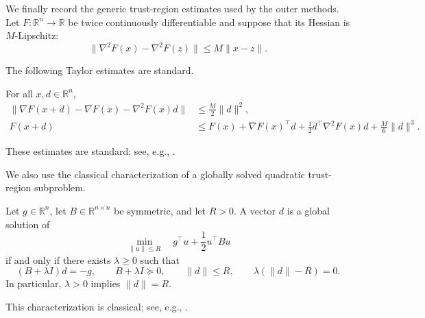 We finally record the generic trust-region estimates used by the outer
methods. Let $F:\mathbb{R}^n\to\mathbb{R}$ be twice continuously
differentiable and suppose that its Hessian is $M$-Lipschitz:
\begin{equation}
    \|\nabla^2F(x)-\nabla^2F(z)\|
    \le M\|x-z\|.
    \label{eq:generic-hessian-lipschitz}
\end{equation}

The following Taylor estimates are standard.

\begin{lemma}
\label{lem:taylor-bounds}
For all $x,d\in\mathbb{R}^n$,
\begin{subequations}
\label{eq:taylor-bounds}
\begin{align}
    \|\nabla F(x+d)-\nabla F(x)-\nabla^2F(x)d\|
    &\le
    \frac{M}{2}\|d\|^2,
    \label{eq:gradient-taylor}
    \\
    F(x+d)
    &\le
    F(x)+\nabla F(x)^\top d
    +\frac12d^\top\nabla^2F(x)d
    +\frac{M}{6}\|d\|^3.
    \label{eq:function-taylor}
\end{align}
\end{subequations}
\end{lemma}

These estimates are standard; see, e.g.,
\citet[Lemma~1.2.4]{nesterov2004introductory}.

We also use the classical characterization of a globally solved
quadratic trust-region subproblem.

\begin{lemma}
\label{lem:tr-global-optimality}
Let $g\in\mathbb{R}^n$, let $B\in\mathbb{R}^{n\times n}$ be symmetric,
and let $R>0$. A vector $d$ is a global solution of
\begin{equation}
    \min_{\|u\|\le R}
    \quad
    g^\top u+\frac12u^\top Bu
    \label{eq:generic-tr-subproblem}
\end{equation}
if and only if there exists $\lambda\ge0$ such that
\begin{equation}
    (B+\lambda I)d=-g,
    \qquad
    B+\lambda I\succeq0,
    \qquad
    \|d\|\le R,
    \qquad
    \lambda(\|d\|-R)=0.
    \label{eq:tr-global-optimality}
\end{equation}
In particular, $\lambda>0$ implies $\|d\|=R$.
\end{lemma}

This characterization is classical; see, e.g.,
\citet[Section~8.7]{luenberger2021linear}.

